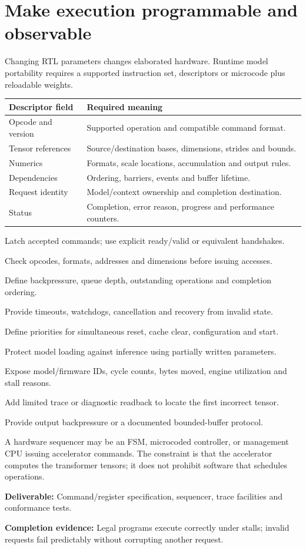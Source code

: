 \documentclass[11pt,a4paper]{article}
\newcommand{\phase}[2]{\clearpage\section{#1}\label{#2}}
\newcommand{\deliver}[2]{\begin{tcolorbox}[colback=pale,colframe=line,boxrule=0.5pt,arc=1mm,left=8pt,right=8pt,top=6pt,bottom=6pt]\textbf{Deliverable:} #1\par\textbf{Completion evidence:} #2\end{tcolorbox}}
\begin{document}
\phase{Make execution programmable and observable}{sec:control}
Changing RTL parameters changes elaborated hardware. Runtime model portability
requires a supported instruction set, descriptors or microcode plus reloadable weights.
\begin{tabularx}{\linewidth}{@{}p{37mm}Y@{}}
\toprule\textbf{Descriptor field} & \textbf{Required meaning}\\\midrule
Opcode and version & Supported operation and compatible command format.\\
Tensor references & Source/destination bases, dimensions, strides and bounds.\\
Numerics & Formats, scale locations, accumulation and output rules.\\
Dependencies & Ordering, barriers, events and buffer lifetime.\\
Request identity & Model/context ownership and completion destination.\\
Status & Completion, error reason, progress and performance counters.\\\bottomrule
\end{tabularx}
\begin{checklist}
\item Latch accepted commands; use explicit ready/valid or equivalent handshakes.
\item Check opcodes, formats, addresses and dimensions before issuing accesses.
\item Define backpressure, queue depth, outstanding operations and completion ordering.
\item Provide timeouts, watchdogs, cancellation and recovery from invalid state.
\item Define priorities for simultaneous reset, cache clear, configuration and start.
\item Protect model loading against inference using partially written parameters.
\item Expose model/firmware IDs, cycle counts, bytes moved, engine utilization and stall reasons.
\item Add limited trace or diagnostic readback to locate the first incorrect tensor.
\item Provide output backpressure or a documented bounded-buffer protocol.
\end{checklist}
A hardware sequencer may be an FSM, microcoded controller, or management CPU
issuing accelerator commands. The constraint is that the accelerator computes
the transformer tensors; it does not prohibit software that schedules operations.
\deliver{Command/register specification, sequencer, trace facilities and conformance
tests.}{Legal programs execute correctly under stalls; invalid requests fail
predictably without corrupting another request.}
\end{document}
